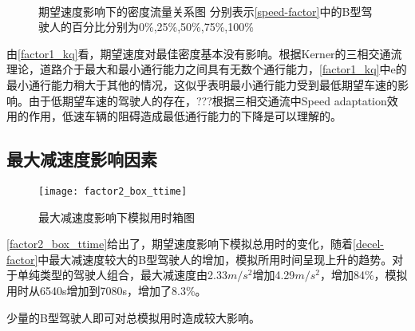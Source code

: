 \begin{figure}[!htb]%
\centering
{}%
\\%
%
\caption[A set of four sub-floats.]{期望速度影响下的密度流量关系图
分别表示\autoref{speed-factor}中的B型驾驶人的百分比分别为0\%,25\%,50\%,75\%,100\%}%
\label{factor1_kq}%
\end{figure}

由\autoref{factor1_kq}看，期望速度对最佳密度基本没有影响。根据Kerner的三相交通流理论，道路介于最大和最小通行能力之间具有无数个通行能力，\autoref{factor1_kq}中e的最小通行能力稍大于其他的情况，这似乎表明最小通行能力受到最低期望车速的影响。由于低期望车速的驾驶人的存在，???根据三相交通流中Speed adaptation效用的作用，低速车辆的阻碍造成最低通行能力的下降是可以理解的。

\subsection{最大减速度影响因素}

\begin{figure}[!htb]
\begin{center}
\texttt{[image: factor2\_box\_ttime]}
\caption{最大减速度影响下模拟用时箱图}
\label{factor2_box_ttime}
\end{center}
\end{figure}

\autoref{factor2_box_ttime}给出了，期望速度影响下模拟总用时的变化，随着\autoref{decel-factor}中最大减速度较大的B型驾驶人的增加，模拟所用时间呈现上升的趋势。对于单纯类型的驾驶人组合，最大减速度由2.33$m/s^2$增加4.29$m/s^2$，增加84\%，模拟用时从6540s增加到7080s，增加了8.3\%。

少量的B型驾驶人即可对总模拟用时造成较大影响。


